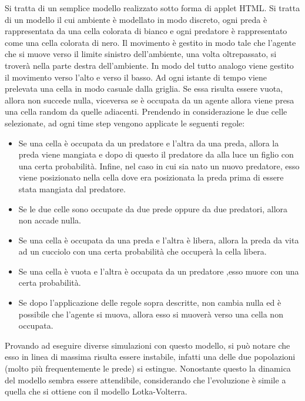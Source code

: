 \documentclass[11pt]{article}
\begin{document}
Si tratta di un semplice modello realizzato sotto forma di applet HTML. Si tratta di un modello il cui ambiente è modellato in modo discreto, ogni preda è rappresentata da una cella colorata di bianco e ogni predatore è rappresentato come una cella colorata di nero. Il movimento è gestito in modo tale che l'agente che si muove verso il limite sinistro dell'ambiente, una volta oltrepassato, si troverà nella parte destra dell'ambiente. In modo del tutto analogo viene gestito il movimento verso l'alto e verso il basso. Ad ogni istante di tempo viene prelevata una cella in modo casuale dalla griglia. Se essa risulta essere vuota, allora non succede nulla, viceversa se è occupata da un agente allora viene presa una cella random da quelle adiacenti. Prendendo in considerazione le due celle selezionate, ad ogni time step vengono applicate le seguenti regole\cite{PhysicsofRisk}:
\begin{itemize}
    \item Se una cella è occupata da un predatore e l'altra da una preda, allora la preda viene mangiata e dopo di questo il predatore da alla luce un figlio con una certa probabilità. Infine, nel caso in cui sia nato un nuovo predatore, esso viene posizionato nella cella dove era posizionata la preda prima di essere stata mangiata dal predatore.
    \item Se le due celle sono occupate da due prede oppure da due predatori, allora non accade nulla.
    \item Se una cella è occupata da una preda e l'altra è libera, allora la preda da vita ad un cucciolo con una certa probabilità che occuperà la cella libera. 
    \item Se una cella è vuota e l'altra è occupata da un predatore ,esso muore con una certa probabilità. 
    \item Se dopo l'applicazione delle regole sopra descritte, non cambia nulla ed è possibile che l'agente si muova, allora esso si muoverà verso una cella non occupata. 
\end{itemize}

Provando ad eseguire diverse simulazioni con questo modello, si può notare che esso in linea di massima risulta essere instabile, infatti una delle due popolazioni (molto più frequentemente le prede) si estingue. Nonostante questo la dinamica del modello sembra essere attendibile, considerando che l'evoluzione è simile a quella che si ottiene con il modello Lotka-Volterra. 
\end{document}

